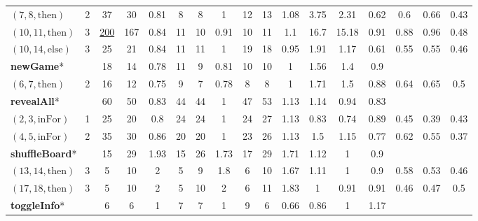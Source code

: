 \documentclass[sigconf]{acmart}
\newcommand{\thenBr}{\text{then}}
\newcommand{\elseBr}{\text{else}}
\newcommand{\inFor}{\text{inFor}}
\newcommand{\un}[1]{\underline{#1}}
\begin{document}
\begin{table}[!t]
\begin{tabular}{lc|ccc|ccc|ccc|ccc|ccc}
    $(7,8,\thenBr)$   & 2        & 37       & 30   & 0.81      & 8  & 8  & 1                & 12 & 13 & 1.08               & 3.75 & 2.31  & 0.62   & 0.6  & 0.66 & 0.43   \\
    $(10,11,\thenBr)$ & 3        & \un{200} & 167  & 0.84      & 11 & 10 & 0.91             & 10 & 11 & 1.1                & 16.7 & 15.18 & 0.91   & 0.88 & 0.96 & 0.48   \\
    $(10,14,\elseBr)$ & 3        & 25       & 21   & 0.84      & 11 & 11 & 1                & 19 & 18 & 0.95               & 1.91 & 1.17  & 0.61   & 0.55 & 0.55 & 0.46   \\
    \hline
    \multicolumn{2}{l|}{\textbf{newGame}*}   
                                 & 18       & 14   & 0.78      & 11 & 9  & 0.81             & 10 & 10 & 1                  & 1.56 & 1.4   & 0.9    &      &      &      \\
    $(6,7,\thenBr)$   & 2        & 16       & 12   & 0.75      & 9  & 7  & 0.78             & 8  & 8  & 1                  & 1.71 & 1.5   & 0.88   & 0.64 & 0.65 & 0.5  \\
    \hline
    \multicolumn{2}{l|}{\textbf{revealAll}*}  
                                 & 60       & 50   & 0.83      & 44 & 44 & 1                & 47 & 53 & 1.13               & 1.14 & 0.94  & 0.83   &      &      &        \\
    $(2,3,\inFor)$    & 1        & 25       & 20   & 0.8       & 24 & 24 & 1                & 24 & 27 & 1.13               & 0.83 & 0.74  & 0.89   & 0.45 & 0.39 &  0.43  \\
    $(4,5,\inFor)$    & 2        & 35       & 30   & 0.86      & 20 & 20 & 1                & 23 & 26 & 1.13               & 1.5  & 1.15  & 0.77   & 0.62 & 0.55 &  0.37  \\
    \hline
\multicolumn{2}{l|}{\textbf{shuffleBoard}*}   
                                 & 15       & 29   & 1.93      & 15 & 26 & 1.73             & 17 & 29 & 1.71               & 1.12 & 1     & 0.9    &      &      &       \\
    $(13,14,\thenBr)$ & 3        & 5        & 10   & 2         & 5  & 9  & 1.8              & 6  & 10 & 1.67               & 1.11 & 1     & 0.9    & 0.58 & 0.53 & 0.46  \\
    $(17,18,\thenBr)$ & 3        & 5        & 10   & 2         & 5  & 10 & 2                & 6  & 11 & 1.83               & 1    & 0.91  & 0.91   & 0.46 & 0.47 & 0.5   \\
    \toprule
\multicolumn{2}{l|}{\textbf{toggleInfo}*}     
                                 & 6        & 6    & 1         & 7  & 7 & 1                 & 9 & 6   & 0.66               & 0.86  & 1     & 1.17  &    &      &       \\

\end{tabular}
\end{table}
\end{document}
